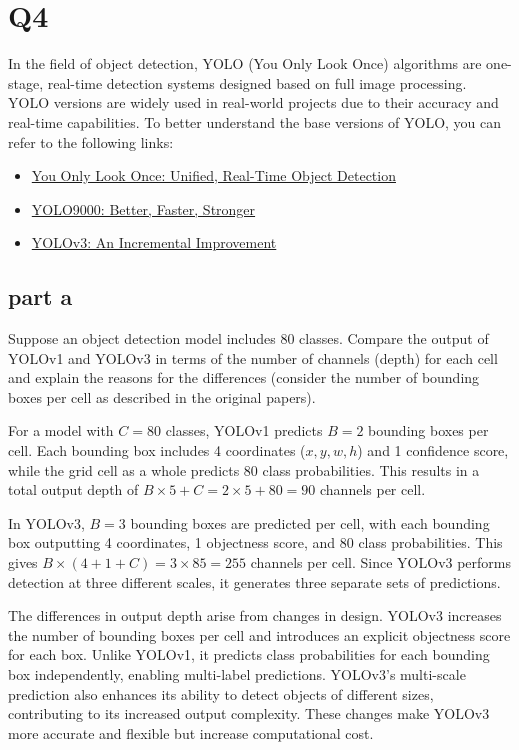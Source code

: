 \newpage
\section{Q4}

In the field of object detection, YOLO (You Only Look Once) algorithms are one-stage, real-time detection systems designed based on full image processing. YOLO versions are widely used in real-world projects due to their accuracy and real-time capabilities. To better understand the base versions of YOLO, you can refer to the following links:
\begin{itemize}
    \item \href{https://arxiv.org/abs/1506.02640}{You Only Look Once: Unified, Real-Time Object Detection}
    \item \href{https://arxiv.org/abs/1612.08242}{YOLO9000: Better, Faster, Stronger}
    \item \href{https://arxiv.org/abs/1804.02767}{YOLOv3: An Incremental Improvement}
\end{itemize}
\subsection{part a}
Suppose an object detection model includes 80 classes. Compare the output of YOLOv1 and YOLOv3 in terms of the number of channels (depth) for each cell and explain the reasons for the differences (consider the number of bounding boxes per cell as described in the original papers).
    \begin{qsolve}
        \begin{qsolve}[]
          For a model with \(C = 80\) classes, YOLOv1 predicts \(B = 2\) bounding boxes per cell. Each bounding box includes 4 coordinates (\(x, y, w, h\)) and 1 confidence score, while the grid cell as a whole predicts 80 class probabilities. This results in a total output depth of \(B \times 5 + C = 2 \times 5 + 80 = 90\) channels per cell.

          In YOLOv3, \(B = 3\) bounding boxes are predicted per cell, with each bounding box outputting 4 coordinates, 1 objectness score, and 80 class probabilities. This gives \(B \times (4 + 1 + C) = 3 \times 85 = 255\) channels per cell. Since YOLOv3 performs detection at three different scales, it generates three separate sets of predictions.
          
          The differences in output depth arise from changes in design. YOLOv3 increases the number of bounding boxes per cell and introduces an explicit objectness score for each box. Unlike YOLOv1, it predicts class probabilities for each bounding box independently, enabling multi-label predictions. YOLOv3’s multi-scale prediction also enhances its ability to detect objects of different sizes, contributing to its increased output complexity. These changes make YOLOv3 more accurate and flexible but increase computational cost.
          
        \end{qsolve}
    \end{qsolve}
